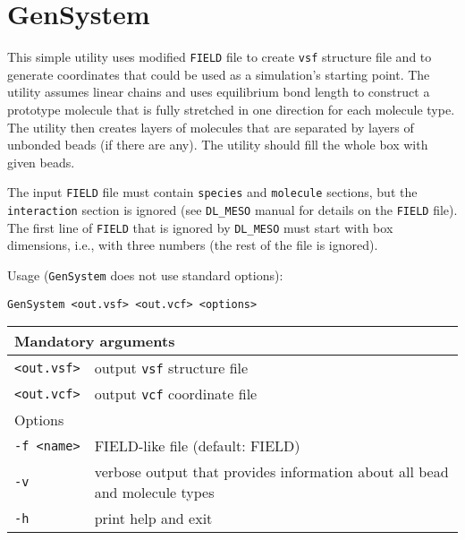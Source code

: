 \section{GenSystem} \label{sec:GenSystem}

This simple utility uses modified \texttt{FIELD} file to create
\texttt{vsf} structure file and to generate coordinates that could be used
as a simulation's starting point. The utility assumes linear chains and
uses equilibrium bond length to construct a prototype molecule that is
fully stretched in one direction for each molecule type. The utility then
creates layers of molecules that are separated by layers of unbonded beads
(if there are any). The utility should fill the whole box with given beads.

The input \texttt{FIELD} file must contain \texttt{species} and
\texttt{molecule} sections, but the \texttt{interaction} section is ignored
(see \texttt{DL\_MESO} manual for details on the \texttt{FIELD} file). The
first line of \texttt{FIELD} that is ignored by \texttt{DL\_MESO} must
start with box dimensions, i.e., with three numbers (the rest of the file
is ignored).

Usage (\texttt{GenSystem} does not use standard options):

\vspace{1em}
\noindent
\texttt{GenSystem <out.vsf> <out.vcf> <options>}

\noindent
\begin{longtable}{p{}p{}}
  \toprule
  \multicolumn{2}{l}{Mandatory arguments} \\
  \midrule
  \texttt{<out.vsf>} & output \texttt{vsf} structure file \\
  \texttt{<out.vcf>} & output \texttt{vcf} coordinate file \\
  \toprule
  \multicolumn{2}{l}{Options} \\
  \midrule
  \texttt{-f <name>} & FIELD-like file (default: FIELD)\\
  \texttt{-v}        & verbose output that provides information about all
    bead and molecule types \\
  \texttt{-h}        & print help and exit \\
  \bottomrule
\end{longtable}
